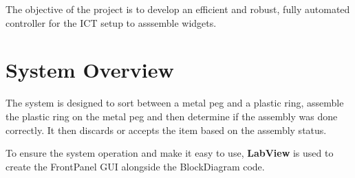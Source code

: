 \documentclass[12pt]{article}
\begin{document}
The objective of the project is to develop an efficient and robust, fully 
automated controller for the ICT setup to asssemble widgets.



\section{System Overview}
The system is designed to sort between a metal peg and a plastic ring, assemble
the plastic ring on the metal peg and then determine if the assembly was done 
correctly. It then discards or accepts the item based on the assembly status.

To ensure the system operation and make it easy to use, \textbf{LabView} is used 
to create the FrontPanel GUI alongside the BlockDiagram code.
\end{document}
